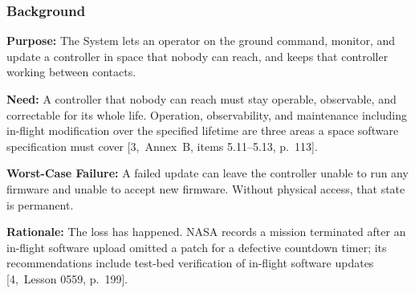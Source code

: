 \documentclass[11pt,a4paper]{article}
\begin{document}
\subsubsection{Background}
\noindent\textbf{Purpose:} The System lets an operator on the ground command,
monitor, and update a controller in space that nobody can reach, and keeps that controller working between contacts.

\medskip
\noindent\textbf{Need:} A controller that nobody can reach must stay operable,
observable, and correctable for its whole life. Operation, observability, and
maintenance including in-flight modification over the specified lifetime are
three areas a space software specification must cover
[3,~Annex~B, items 5.11--5.13, p.~113].

\medskip
\noindent\textbf{Worst-Case Failure:} A failed update can leave the controller
unable to run any firmware and unable to accept new firmware. Without physical
access, that state is permanent.

\medskip
\noindent\textbf{Rationale:} The loss has happened. NASA records a mission
terminated after an in-flight software upload omitted a patch for a defective
countdown timer; its recommendations include test-bed verification of in-flight
software updates [4,~Lesson 0559, p.~199].
\end{document}
